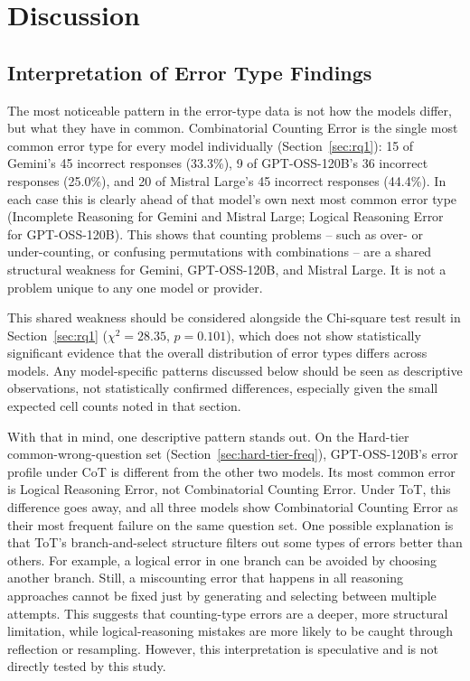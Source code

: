 \chapter{Discussion}
\label{chap:discussion}

\section{Interpretation of Error Type Findings}
\label{sec:error-type-interpretation}

The most noticeable pattern in the error-type data is not how the models
differ, but what they have in common. Combinatorial Counting Error is
the single most common error type for every model individually
(Section~\ref{sec:rq1}): 15 of Gemini's 45 incorrect responses
(33.3\%), 9 of GPT-OSS-120B's 36 incorrect responses (25.0\%), and 20 of
Mistral Large's 45 incorrect responses (44.4\%). In each case this is
clearly ahead of that model's own next most common error type
(Incomplete Reasoning for Gemini and Mistral Large; Logical Reasoning
Error for GPT-OSS-120B). This shows that counting problems -- such as
over- or under-counting, or confusing permutations with combinations --
are a shared structural weakness for Gemini, GPT-OSS-120B, and Mistral
Large. It is not a problem unique to any one model or provider.

This shared weakness should be considered alongside the Chi-square test
result in Section~\ref{sec:rq1} ($\chi^2 = 28.35$, $p = 0.101$), which
does not show statistically significant evidence that the overall
distribution of error types differs across models. Any model-specific
patterns discussed below should be seen as descriptive observations, not
statistically confirmed differences, especially given the small expected
cell counts noted in that section.

With that in mind, one descriptive pattern stands out. On the Hard-tier
common-wrong-question set (Section~\ref{sec:hard-tier-freq}),
GPT-OSS-120B's error profile under CoT is different from the other two
models. Its most common error is Logical Reasoning Error, not
Combinatorial Counting Error. Under ToT, this difference goes away, and
all three models show Combinatorial Counting Error as their most
frequent failure on the same question set. One possible explanation is
that ToT's branch-and-select structure filters out some types of errors
better than others. For example, a logical error in one branch can be
avoided by choosing another branch. Still, a miscounting error that
happens in all reasoning approaches cannot be fixed just by generating
and selecting between multiple attempts. This suggests that
counting-type errors are a deeper, more structural limitation, while
logical-reasoning mistakes are more likely to be caught through
reflection or resampling. However, this interpretation is speculative
and is not directly tested by this study.

